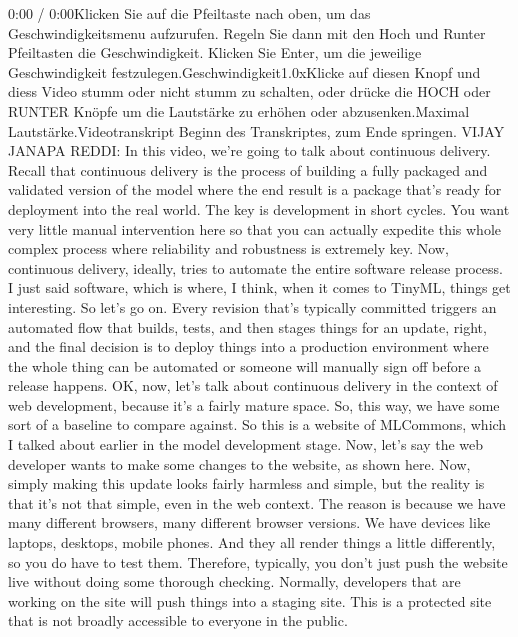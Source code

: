 {{{{    0:00 / 0:00Klicken Sie auf die Pfeiltaste nach oben, um das Geschwindigkeitsmenu aufzurufen. Regeln Sie dann mit den Hoch und Runter Pfeiltasten die Geschwindigkeit. Klicken Sie Enter, um die jeweilige Geschwindigkeit festzulegen.Geschwindigkeit1.0xKlicke auf diesen Knopf und diess Video stumm oder nicht stumm zu schalten, oder drücke die HOCH oder RUNTER Knöpfe um die Lautstärke zu erhöhen oder abzusenken.Maximal Lautstärke.Videotranskript
    Beginn des Transkriptes, zum Ende springen.
    VIJAY JANAPA REDDI: In this video, we're going
    to talk about continuous delivery.
    Recall that continuous delivery is the process
    of building a fully packaged and validated version of the model where
    the end result is a package that's ready for deployment into the real world.
    The key is development in short cycles.
    You want very little manual intervention here so
    that you can actually expedite this whole complex process where reliability
    and robustness is extremely key.
    Now, continuous delivery, ideally, tries to automate the entire software release
    process.
    I just said software, which is where, I think, when it comes to TinyML,
    things get interesting.
    So let's go on.
    Every revision that's typically committed
    triggers an automated flow that builds, tests, and then
    stages things for an update, right, and the final decision
    is to deploy things into a production environment
    where the whole thing can be automated or someone will manually
    sign off before a release happens.
    OK, now, let's talk about continuous delivery
    in the context of web development, because it's a fairly mature space.
    So, this way, we have some sort of a baseline to compare against.
    So this is a website of MLCommons, which I talked about earlier in the model
    development stage.
    Now, let's say the web developer wants to make some changes to the website,
    as shown here.
    Now, simply making this update looks fairly harmless and simple,
    but the reality is that it's not that simple, even in the web context.
    The reason is because we have many different browsers,
    many different browser versions.
    We have devices like laptops, desktops, mobile phones.
    And they all render things a little differently,
    so you do have to test them.
    Therefore, typically, you don't just push the website live
    without doing some thorough checking.
    Normally, developers that are working on the site
    will push things into a staging site.
    This is a protected site that is not broadly
    accessible to everyone in the public.
}}}}

